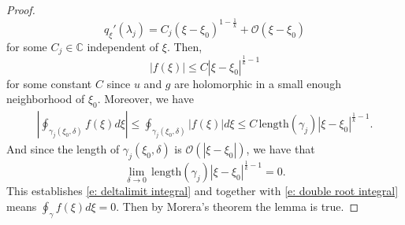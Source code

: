 \documentclass[a4paper,11pt]{article}
\theoremstyle{definition}
\begin{document}
\begin{proof}
    \begin{equation}
        q_\xi'(\lambda_j) = C_j(\xi-\xi_0)^{1-\frac1k} +\mathcal{O}(\xi-\xi_0) 
    \end{equation}
    for some $C_j\in \mathbb{C}$ independent of $\xi$. Then, \begin{equation}
        |f(\xi)|\leq C|\xi-\xi_0|^{\frac1k-1}
    \end{equation}
    for some constant $C$ since $u$ and $g$ are holomorphic in a small enough neighborhood of $\xi_0$. Moreover, we have   
    \begin{equation}
        \begin{split}
            \left| \oint_{\gamma_j(\xi_0,\delta)}f(\xi)d\xi\right| \leq \oint_{\gamma_j(\xi_0,\delta)} \left| f(\xi) \right|d\xi \leq C\,\text{length}(\gamma_j)|\xi-\xi_0|^{\frac1k-1}.
        \end{split}
    \end{equation}
    And since the length of $\gamma_j(\xi_0,\delta)$ is $\mathcal{O}(|\xi-\xi_0|)$, we have that \begin{equation}
        \lim_{\delta\to0}\, \text{length}(\gamma_j)|\xi-\xi_0|^{\frac1k-1} = 0.
    \end{equation}
    This establishes \eqref{e: deltalimit integral} and together with \eqref{e: double root integral} means $\oint_\gamma f(\xi)d\xi=0$. Then by Morera's theorem the lemma is true.  
\end{proof}
\end{document}
